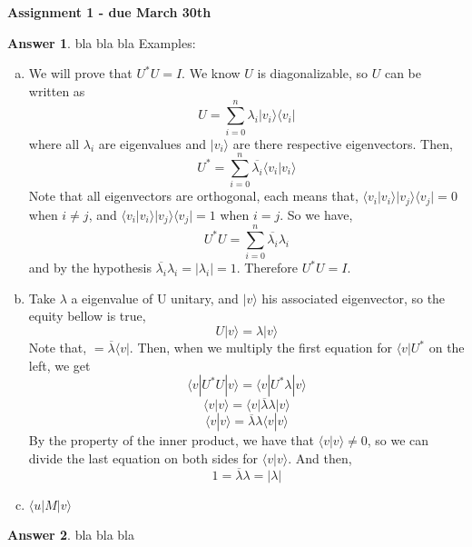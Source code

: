 \documentclass[12pt]{article}
\newcommand{\ket}[1]{|#1\rangle}
\newcommand{\bra}[1]{\langle#1|}
\newcommand{\ketbra}[2]{| #1 \rangle \langle #2 |}
\newcommand{\braket}[2]{\langle  #1 |#2 \rangle}
\theoremstyle{plain}
\theoremstyle{definition}
\newtheorem{ans}{Answer}
\begin{document}
\begin{center}
\Large \textbf{{Assignment 1 - due March 30th}}
\end{center} 


\begin{ans}
 bla bla bla
 Examples:
 \begin{enumerate}[(a)]
 	\item We will prove that $U^{*}U = I$. We know $U$ is diagonalizable, so $U$ can be written as \[U = \sum_{i=0}^{n} \lambda_i \ketbra{v_i}{v_i}\] where
			all $\lambda_i$ are eigenvalues and $\ket{v_i}$ are there respective eigenvectors. 
			Then, \[ U^{*} = \sum_{i=0}^{n} \overline{\lambda_i} \braket{v_i}{v_i}\]
			Note that all eigenvectors are orthogonal, each means that, $\braket{v_i}{v_i} \ketbra{v_j}{v_j} = 0$ when $i \neq j$, and $\braket{v_i}{v_i} \ketbra{v_j}{v_j} = 1$
			when $i = j$. So we have, \[ U^{*}U = \sum_{i=0}^{n} \overline{\lambda_i} \lambda_i\] and by the hypothesis
			$\overline{\lambda_i} \lambda_i = \left\lvert \lambda_i \right\rvert = 1$. Therefore $ U^{*}U = I$.
 	\item Take $\lambda$ a eigenvalue of U unitary, and $\ket{v}$ his associated eigenvector, so the equity bellow
			is true, \[ U \ket{v} = \lambda\ket{v} \]
			Note that, $ = \overline{\lambda}\bra{v}$.
			Then, when we multiply the first equation for $\bra{v}U^{*}$ on the left, we get 
			\[ \bra{v}U^{*} U \ket{v} = \bra{v}U^{*} \lambda \ket{v}\]
			\[ \braket{v}{v} = \bra{v}\overline{\lambda}\lambda \ket{v}\]
			\[ \braket{v}{v} = \overline{\lambda}\lambda \braket{v}{v}\]
			By the property of the inner product, we have that $\braket{v}{v} \neq 0$, so we can divide the last
			equation on both sides for $\braket{v}{v}$. And then, 
			\[ 1 = \overline{\lambda}\lambda = \left\lvert \lambda \right\rvert\]
 	\item $\bra u M \ket v$
 \end{enumerate}
 
\end{ans}

\noindent \hrulefill

\begin{ans}
 bla bla bla
\end{ans}

\noindent \hrulefill
\end{document}
